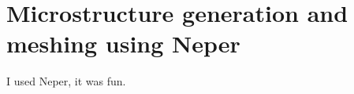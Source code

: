 \documentclass[micro_gen.tex]{subfiles}
\begin{document}
\chapter{Microstructure generation and meshing using Neper}

I used Neper, it was fun.
\end{document}
